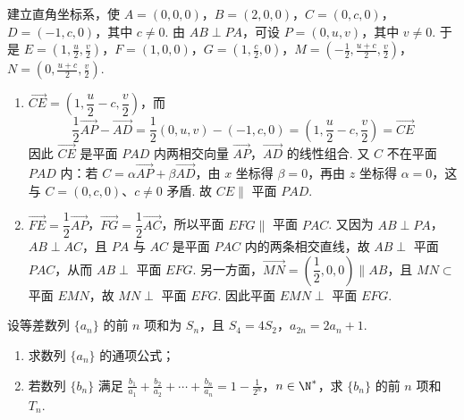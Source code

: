 \begin{solution}
建立直角坐标系，使 \(A=(0,0,0)\)，\(B=(2,0,0)\)，\(C=(0,c,0)\)，\(D=(-1,c,0)\)，其中 \(c\ne0\). 由 \(AB\perp PA\)，可设 \(P=(0,u,v)\)，其中 \(v\ne0\). 于是
\(E=\left(1,\frac{u}{2},\frac{v}{2}\right)\)，\(F=(1,0,0)\)，\(G=\left(1,\frac{c}{2},0\right)\)，\(M=\left(-\frac12,\frac{u+c}{2},\frac{v}{2}\right)\)，\(N=\left(0,\frac{u+c}{2},\frac{v}{2}\right)\).
\begin{enumerate}
\item \(\overrightarrow{CE}=\left(1,\dfrac{u}{2}-c,\dfrac{v}{2}\right)\)，而
\[
\frac12\overrightarrow{AP}-\overrightarrow{AD}=\frac12(0,u,v)-(-1,c,0)=\left(1,\frac{u}{2}-c,\frac{v}{2}\right)=\overrightarrow{CE}
\]
因此 \(\overrightarrow{CE}\) 是平面 \(PAD\) 内两相交向量 \(\overrightarrow{AP}\)，\(\overrightarrow{AD}\) 的线性组合. 又 \(C\) 不在平面 \(PAD\) 内：若 \(C=\alpha\overrightarrow{AP}+\beta\overrightarrow{AD}\)，由 \(x\) 坐标得 \(\beta=0\)，再由 \(z\) 坐标得 \(\alpha=0\)，这与 \(C=(0,c,0)\)、\(c\ne0\) 矛盾. 故 \(CE\parallel\) 平面 \(PAD\).
\item \(\overrightarrow{FE}=\dfrac12\overrightarrow{AP}\)，\(\overrightarrow{FG}=\dfrac12\overrightarrow{AC}\)，所以平面 \(EFG\parallel\) 平面 \(PAC\). 又因为 \(AB\perp PA\)，\(AB\perp AC\)，且 \(PA\) 与 \(AC\) 是平面 \(PAC\) 内的两条相交直线，故 \(AB\perp\) 平面 \(PAC\)，从而 \(AB\perp\) 平面 \(EFG\). 另一方面，\(\overrightarrow{MN}=\left(\dfrac12,0,0\right)\parallel AB\)，且 \(MN\subset\) 平面 \(EMN\)，故 \(MN\perp\) 平面 \(EFG\). 因此平面 \(EMN\perp\) 平面 \(EFG\).
\end{enumerate}
\end{solution}

\begin{problem}
设等差数列 \(\{a_{n}\}\) 的前 \(n\) 项和为 \(S_{n}\)，且 \(S_{4} = 4S_{2}\)，\(a_{2n} = 2a_{n} + 1\).

\begin{enumerate}
\item 求数列 \( \{a_{n}\} \) 的通项公式；
\item 若数列 \( \{b_{n}\} \) 满足 \(\frac{b_{1}}{a_{1}} + \frac{b_{2}}{a_{2}} + \cdots + \frac{b_{n}}{a_{n}} = 1 - \frac{1}{2^{n}}\)，\(n \in \N^{*}\)，求 \( \{b_{n}\} \) 的前 \(n\) 项和 \( T_{n} \).
\end{enumerate}
\end{problem}

